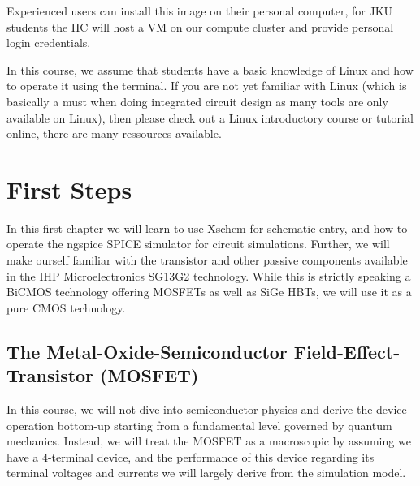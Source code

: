 \documentclass[
  a4paper,
  DIV=11,
  numbers=noendperiod]{scrartcl}
\begin{document}
Experienced users can install this image on their personal computer, for
JKU students the IIC will host a VM on our compute cluster and provide
personal login credentials.

\begin{tcolorbox}[enhanced jigsaw, breakable, title=\textcolor{quarto-callout-warning-color}{\faExclamationTriangle}\hspace{0.5em}{Linux}, left=2mm, bottomrule=.15mm, opacitybacktitle=0.6, opacityback=0, colframe=quarto-callout-warning-color-frame, leftrule=.75mm, bottomtitle=1mm, colbacktitle=quarto-callout-warning-color!10!white, toprule=.15mm, rightrule=.15mm, toptitle=1mm, titlerule=0mm, arc=.35mm, colback=white, coltitle=black]

In this course, we assume that students have a basic knowledge of Linux
and how to operate it using the terminal. If you are not yet familiar
with Linux (which is basically a must when doing integrated circuit
design as many tools are only available on Linux), then please check out
a Linux introductory course or tutorial online, there are many
ressources available.

\end{tcolorbox}

\section{First Steps}\label{sec-first-steps}

In this first chapter we will learn to use Xschem for schematic entry,
and how to operate the ngspice SPICE simulator for circuit simulations.
Further, we will make ourself familiar with the transistor and other
passive components available in the IHP Microelectronics SG13G2
technology. While this is strictly speaking a BiCMOS technology offering
MOSFETs as well as SiGe HBTs, we will use it as a pure CMOS technology.

\subsection{The Metal-Oxide-Semiconductor Field-Effect-Transistor
(MOSFET)}\label{sec-mosfet}

In this course, we will not dive into semiconductor physics and derive
the device operation bottom-up starting from a fundamental level
governed by quantum mechanics. Instead, we will treat the MOSFET as a
macroscopic by assuming we have a 4-terminal device, and the performance
of this device regarding its terminal voltages and currents we will
largely derive from the simulation model.
\end{document}
